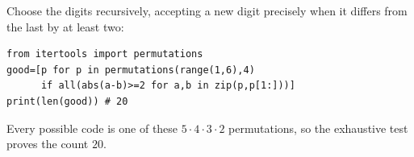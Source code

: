 Choose the digits recursively, accepting a new digit precisely when it differs from the last by at least two:
\begin{verbatim}
from itertools import permutations
good=[p for p in permutations(range(1,6),4)
      if all(abs(a-b)>=2 for a,b in zip(p,p[1:]))]
print(len(good)) # 20
\end{verbatim}
Every possible code is one of these $5\cdot4\cdot3\cdot2$ permutations, so the exhaustive test proves the count $\boxed{20}$.
